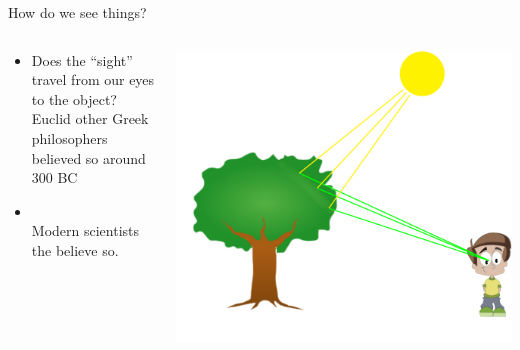 \begin{frame}{How do we see things?}
  \begin{columns}
    \begin{column}{0.7\textwidth}
      \begin{itemize}
        \item
          Does the ``sight'' travel from our eyes to the object?\\
           {\color{red}Euclid other Greek philosophers believed so around 300 BC}
       \item
         \color{black}{or the ``light'' travels from the object to our eyes?}\\
          {\color{red}Modern scientists the believe so.}
      \end{itemize}
    \end{column}
    \hspace{-2cm}
    \begin{column}{0.3\textwidth}
      \centering
        \includegraphics[width=1.4\textwidth]{media/suntreeboy.pdf}
    \end{column}
  \end{columns}
\end{frame}

